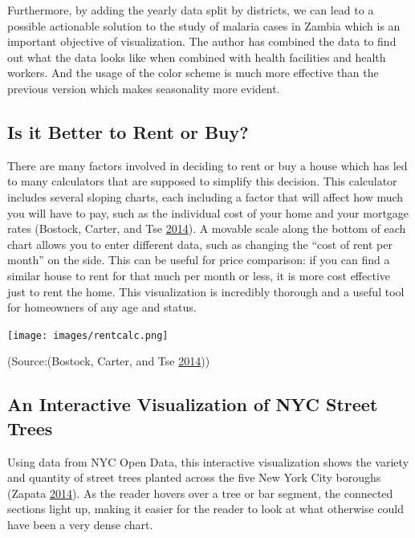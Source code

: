 \documentclass[]{book}
\begin{document}
Furthermore, by adding the yearly data split by districts, we can lead to a possible actionable solution to the study of malaria cases in Zambia which is an important objective of visualization. The author has combined the data to find out what the data looks like when combined with health facilities and health workers. And the usage of the color scheme is much more effective than the previous version which makes seasonality more evident.

\hypertarget{is-it-better-to-rent-or-buy}{%
\subsection{Is it Better to Rent or Buy?}\label{is-it-better-to-rent-or-buy}}

There are many factors involved in deciding to rent or buy a house which has led to many calculators that are supposed to simplify this decision. This calculator includes several sloping charts, each including a factor that will affect how much you will have to pay, such as the individual cost of your home and your mortgage rates (Bostock, Carter, and Tse \protect\hyperlink{ref-rent_or_buy}{2014}). A movable scale along the bottom of each chart allows you to enter different data, such as changing the ``cost of rent per month'' on the side. This can be useful for price comparison: if you can find a similar house to rent for that much per month or less, it is more cost effective just to rent the home. This visualization is incredibly thorough and a useful tool for homeowners of any age and status.

\texttt{[image: images/rentcalc.png]}

(Source:(Bostock, Carter, and Tse \protect\hyperlink{ref-rent_or_buy}{2014}))

\hypertarget{an-interactive-visualization-of-nyc-street-trees}{%
\subsection{An Interactive Visualization of NYC Street Trees}\label{an-interactive-visualization-of-nyc-street-trees}}

Using data from NYC Open Data, this interactive visualization shows the variety and quantity of street trees planted across the five New York City boroughs (Zapata \protect\hyperlink{ref-trees}{2014}). As the reader hovers over a tree or bar segment, the connected sections light up, making it easier for the reader to look at what otherwise could have been a very dense chart.
\end{document}
